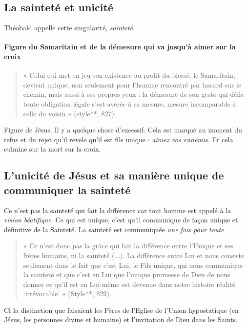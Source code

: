 \subsection{La sainteté et unicité}

Théobald appelle cette singularité, \textit{sainteté}.




\paragraph{Figure du Samaritain et de la démesure qui va jusqu'à aimer sur la croix}
\begin{quote}
    « Celui qui met en jeu son existence au profit du blessé, le Samaritain, devient unique, non seulement pour l’homme rencontré par hasard sur le chemin, mais aussi à ses propres yeux : la démesure de son geste qui défie toute obligation légale s’est avérée à sa mesure, mesure incomparable à celle du voisin » (style**, 827).
\end{quote}

Figure de Jésus. Il y a quelque chose d'excessif. 
Cela est marqué au moment du refus et du rejet qu'il revele qu'il est fils unique : \textit{aimez vos ennemis}. Et cela culmine sur la mort sur la croix. 


\subsection{L’unicité de Jésus et sa manière unique de communiquer la sainteté}


 Ce n'est pas la sainteté qui fait la différence car tout homme est appelé à la \textit{vision béatifique.} Ce qui est unique, c'est qu'il communique de façon unique et définitive de la Sainteté. 
 La sainteté est communiquée \textit{une fois pour toute}

\begin{quote}
    « Ce n’est donc pas la grâce qui fait la différence entre l’Unique et ses frères humains, ni la sainteté (...). La différence entre Lui et nous consiste seulement dans le fait que c’est Lui, le Fils unique, qui nous communique la sainteté et que c’est en Lui que l’unique promesse de Dieu de nous donner ce qu’il est en Lui-même est devenue dans  notre histoire réalité ‘irrévocable’ » (Style**, 829).
\end{quote}

Cf la distinction que faisaient les Pères de l'Eglise de l'Union hypostatique (en Jésus, les personnes divine et humaine) et l'invitation de Dieu dans les Saints.


